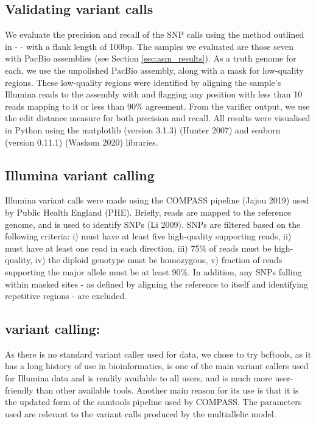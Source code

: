 \subsection{Validating variant calls}

We evaluate the precision and recall of the SNP calls using the method outlined in  -  - with a flank length of 100bp. The samples we evaluated are those seven with PacBio assemblies (see Section \autoref{sec:asm_results}). As a truth genome for each, we use the unpolished  PacBio assembly, along with a mask for low-quality regions. These low-quality regions were identified by aligning the sample's Illumina reads to the assembly with  and flagging any position with less than 10 reads mapping to it or less than 90\% agreement. From the varifier output, we use the edit distance measure for both precision and recall. All results were visualised in Python using the matplotlib (version 3.1.3) (Hunter 2007) and seaborn (version 0.11.1) (Waskom 2020) libraries.

\subsection{Illumina variant calling}

Illumina variant calls were made using the COMPASS pipeline (Jajou 2019) used by Public Health England (PHE). Briefly, reads are mapped to the \mtb{} reference genome, and  is used to identify SNPs (Li 2009). SNPs are filtered based on the following criteria: i) must have at least five high-quality supporting reads, ii) must have at least one read in each direction, iii) 75\% of reads must be high-quality, iv) the diploid genotype must be homozygous, v) fraction of reads supporting the major allele must be at least 90\%. In addition, any SNPs falling within masked sites - as defined by aligning the \mtb{} reference to itself and identifying repetitive regions - are excluded.

\subsection{\ont{} variant calling: }
\label{sec:bcftools-filters}

As there is no standard variant caller used for \mtb{} \ont{} data, we chose to try bcftools, as it has a long history of use in bioinformatics, is one of the main variant callers used for Illumina data  and is readily available to all users, and is much more user-friendly than other available tools. Another main reason for its use is that it is the updated form of the samtools pipeline used by COMPASS. The parameters used are
relevant to the variant calls produced by the multiallelic
model.

